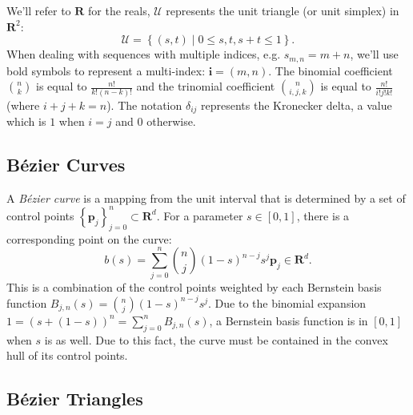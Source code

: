 \documentclass[oneside, reqno]{amsart}
\theoremstyle{definition}
\newcommand{\reals}{\mathbf{R}}
\newcommand{\utri}{\mathcal{U}}
\begin{document}
We'll refer to \(\reals\) for the reals, \(\utri\) represents
the unit triangle (or unit simplex) in \(\reals^2\):
\begin{equation}
\utri = \left\{(s, t) \mid 0 \leq s, t, s + t \leq 1\right\}.
\end{equation}
When dealing with sequences with multiple indices, e.g.
\(s_{m, n} = m + n\), we'll use bold symbols to represent
a multi-index: \(\bm{i} = (m, n)\).
The binomial coefficient
\(\binom{n}{k}\) is equal to \(\frac{n!}{k! (n - k)!}\) and the trinomial
coefficient \(\binom{n}{i, j, k}\) is equal to \(\frac{n!}{i! j! k!}\)
(where \(i + j + k = n\)). The notation \(\delta_{ij}\) represents the
Kronecker delta, a value which is \(1\) when \(i = j\) and \(0\)
otherwise.

\subsection{B\'{e}zier Curves}

A \emph{B\'{e}zier curve} is a mapping from the unit interval
that is determined by a set of control points
\(\left\{\bm{p}_j\right\}_{j = 0}^n \subset \reals^d\).
For a parameter \(s \in \left[0, 1\right]\), there is a corresponding
point on the curve:
\begin{equation}
b(s) = \sum_{j = 0}^n \binom{n}{j} (1 - s)^{n - j} s^j \bm{p}_j \in
  \reals^d.
\end{equation}
This is a combination of the control points weighted by
each Bernstein basis function
\(B_{j, n}(s) = \binom{n}{j} (1 - s)^{n - j} s^j\).
Due to the binomial expansion
\(1 = (s + (1 - s))^n = \sum_{j = 0}^n B_{j, n}(s)\),
a Bernstein basis function is in
\(\left[0, 1\right]\) when \(s\) is as well. Due to this fact, the
curve must be contained in the convex hull of its control points.

\subsection{B\'{e}zier Triangles}
\end{document}
